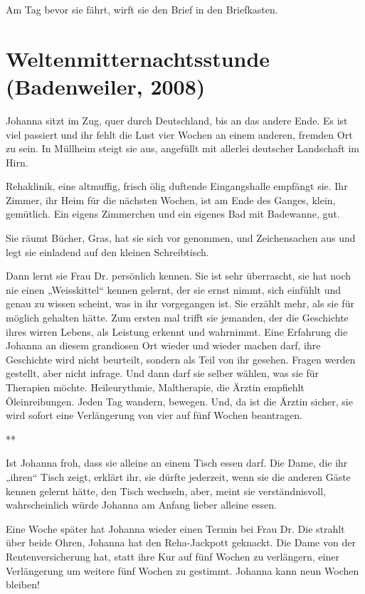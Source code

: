 \documentclass[10pt,titlepage,a5paper]{book}
\newcommand{\sterne}{\par{\centering ***\par}}
\begin{document}
Am Tag bevor sie fährt, wirft sie den Brief in den Briefkasten. 



\section*{ Weltenmitternachtsstunde (Badenweiler, 2008)}



Johanna sitzt im Zug, quer durch Deutschland, bis an das andere Ende. Es ist viel passiert und ihr fehlt die Lust vier Wochen an einem anderen, fremden Ort zu sein. In Müllheim steigt sie aus, angefüllt mit allerlei deutscher Landschaft im Hirn.

Rehaklinik, eine altmuffig, frisch ölig duftende Eingangshalle empfängt sie. Ihr Zimmer, ihr Heim für die nächsten Wochen, ist am Ende des Ganges, klein, gemütlich. Ein eigens Zimmerchen und ein eigenes Bad mit Badewanne, gut.

Sie räumt Bücher, Gras, hat sie sich vor genommen, und Zeichensachen aus und legt sie einladend auf den kleinen Schreibtisch.

Dann lernt sie Frau Dr. persönlich kennen. Sie ist sehr überrascht, sie hat noch nie einen „Weisskittel“ kennen gelernt, der sie ernst nimmt, sich einfühlt und genau zu wissen scheint, was in ihr vorgegangen ist. Sie erzählt mehr, als sie für möglich gehalten hätte. Zum ersten mal trifft sie jemanden, der die Geschichte ihres wirren Lebens, als Leistung erkennt und wahrnimmt. Eine Erfahrung die Johanna an diesem grandiosen Ort wieder und wieder machen darf, ihre Geschichte wird nicht beurteilt, sondern als Teil von ihr gesehen. Fragen werden gestellt, aber nicht infrage. Und dann darf sie selber wählen, was sie für Therapien möchte. Heileurythmie, Maltherapie, die Ärztin empfiehlt Öleinreibungen. Jeden Tag wandern, bewegen. Und, da ist die Ärztin sicher, sie wird sofort eine Verlängerung von vier auf fünf Wochen beantragen.

\sterne

Ist Johanna froh, dass sie alleine an einem Tisch essen darf. Die Dame, die ihr „ihren“ Tisch zeigt, erklärt ihr, sie dürfte jederzeit, wenn sie die anderen Gäste kennen gelernt hätte, den Tisch wechseln, aber, meint sie verständnisvoll, wahrscheinlich würde Johanna am Anfang lieber alleine essen.

Eine Woche später hat Johanna wieder einen Termin bei Frau Dr. Die strahlt über beide Ohren, Johanna hat den Reha-Jackpott geknackt. Die Dame von der Rentenversicherung hat, statt ihre Kur auf fünf Wochen zu verlängern, einer Verlängerung um weitere fünf Wochen zu gestimmt. Johanna kann neun Wochen bleiben!
\end{document}
